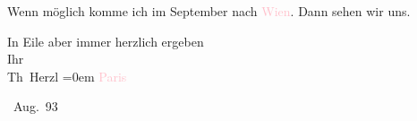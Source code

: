 \pstart
           Wenn möglich komme ich im September nach \textcolor{pink}{Wien}\ledrightnote{\textcolor{pink}{Wien}}. Dann sehen wir uns.\pend
           
\pstart
           In Eile aber immer herzlich ergeben{\\[\baselineskip]} Ihr{\\[\baselineskip]}\spacefill\mbox{Th Herzl}\pend
           \leftskip=0em{}
\pstart
           \noindent{}\textcolor{pink}{Paris}\ledrightnote{\textcolor{pink}{Paris}}\pend
           
 Aug. 93\pend
           \endnumbering{}  \newcommand{\dateiname}{L03832}\newcommand{\titel}{Theodor Herzl an Arthur Schnitzler, 6. 8. 1893}\newcommand{\editorInnen}{Selma Jahnke und Martin Anton Müller}
